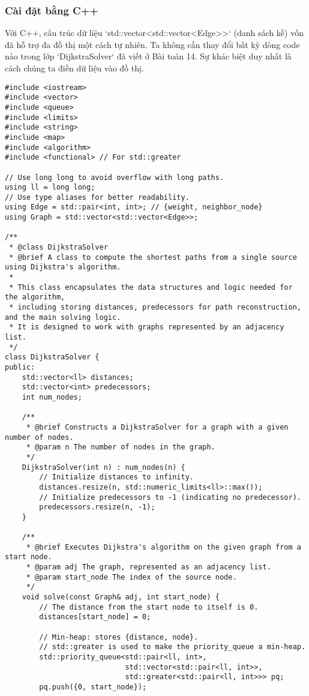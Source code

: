\documentclass[a4paper,12pt]{article}
\begin{document}
\subsubsection{Cài đặt bằng C++}
Với C++, cấu trúc dữ liệu `std::vector<std::vector<Edge>>` (danh sách kề) vốn đã hỗ trợ đa đồ thị một cách tự nhiên. Ta không cần thay đổi bất kỳ dòng code nào trong lớp `DijkstraSolver` đã viết ở Bài toán 14. Sự khác biệt duy nhất là cách chúng ta điền dữ liệu vào đồ thị.
\begin{lstlisting}[style=cppstyle, caption={Xây dựng đa đồ thị trong C++. Logic thuật toán không đổi.}, label={lst:cpp_multi_full}]
#include <iostream>
#include <vector>
#include <queue>
#include <limits>
#include <string>
#include <map>
#include <algorithm>
#include <functional> // For std::greater

// Use long long to avoid overflow with long paths.
using ll = long long;
// Use type aliases for better readability.
using Edge = std::pair<int, int>; // {weight, neighbor_node}
using Graph = std::vector<std::vector<Edge>>;

/**
 * @class DijkstraSolver
 * @brief A class to compute the shortest paths from a single source using Dijkstra's algorithm.
 *
 * This class encapsulates the data structures and logic needed for the algorithm,
 * including storing distances, predecessors for path reconstruction, and the main solving logic.
 * It is designed to work with graphs represented by an adjacency list.
 */
class DijkstraSolver {
public:
    std::vector<ll> distances;
    std::vector<int> predecessors;
    int num_nodes;

    /**
     * @brief Constructs a DijkstraSolver for a graph with a given number of nodes.
     * @param n The number of nodes in the graph.
     */
    DijkstraSolver(int n) : num_nodes(n) {
        // Initialize distances to infinity.
        distances.resize(n, std::numeric_limits<ll>::max());
        // Initialize predecessors to -1 (indicating no predecessor).
        predecessors.resize(n, -1);
    }

    /**
     * @brief Executes Dijkstra's algorithm on the given graph from a start node.
     * @param adj The graph, represented as an adjacency list.
     * @param start_node The index of the source node.
     */
    void solve(const Graph& adj, int start_node) {
        // The distance from the start node to itself is 0.
        distances[start_node] = 0;
        
        // Min-heap: stores {distance, node}.
        // std::greater is used to make the priority_queue a min-heap.
        std::priority_queue<std::pair<ll, int>, 
                            std::vector<std::pair<ll, int>>, 
                            std::greater<std::pair<ll, int>>> pq;
        pq.push({0, start_node});


\end{lstlisting}
\end{document}
